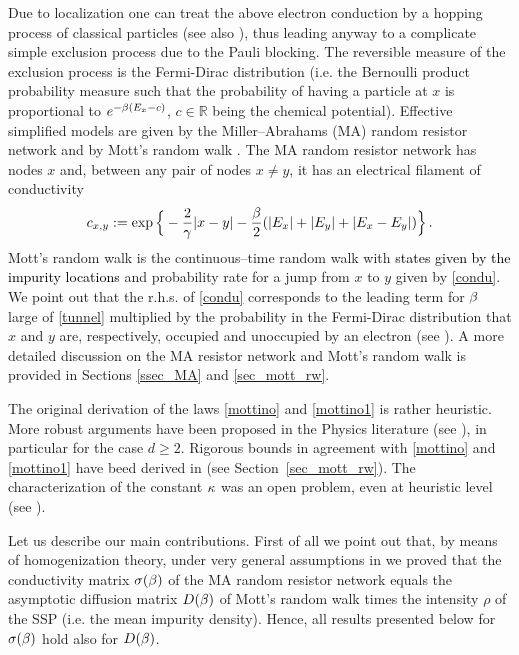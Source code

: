 \documentclass[12pt,a4paper,reqno]{amsart}
\newcommand{\bbR}{{\ensuremath{\mathbb R}} }
\newcommand{\rosso}{\textcolor{black}} %
\newcommand{\be}{\begin{equation}}
\newcommand{\en}{\end{equation}}
\begin{document}
Due to   localization one can treat the above electron conduction by a hopping process of classical particles (see also \cite{ABS,BRSW}), thus leading  anyway to a complicate simple exclusion process due to the  Pauli blocking. The reversible measure of the exclusion process is  the Fermi-Dirac distribution (i.e. the Bernoulli product probability measure  such that the probability of having a particle at $x$ is proportional to $e^{-\beta (E_x-c)}$, $c\in \bbR$ being the chemical potential).
 Effective simplified models   are  given by the Miller--Abrahams (MA) random resistor network \cite{AHL,MA,POF,Sa,SE}   and  by Mott's random walk \cite{FSS}.
The MA random resistor network has nodes $x$ and,   between any  pair of nodes $x\not=y$, it has  an electrical filament of  conductivity 
\be\label{condu}
c_{x,y}:=\exp\Big\{ - \frac{2}{\gamma} |x-y| -\frac{\b}{2} ( |E_x|+ |E_y|+ |E_x-E_y|) \Big\}\,.
\en
Mott's random walk is the continuous--time random walk with \rosso{states given by the impurity locations} and probability rate for a jump from $x$ to $y$ given by \eqref{condu}. We point out that the r.h.s. of \eqref{condu}   corresponds to the leading term for $\beta$ large of \eqref{tunnel} multiplied by the probability in the Fermi-Dirac distribution that $x$ and $y$ are, respectively,   occupied and unoccupied  by an electron 
(see \cite[Eq.~(3.7)]{AHL}). A more detailed discussion on the MA resistor network and Mott's random walk  is provided in Sections \ref{ssec_MA} and \ref{sec_mott_rw}.



The original  derivation of the  laws \eqref{mottino} and \eqref{mottino1} is rather heuristic.  More robust    arguments  have been proposed in the Physics  literature (see \cite{AHL,Po,POF,Sa,SE}), in particular for the case $d\geq 2$.  Rigorous bounds in agreement with \eqref{mottino} and \eqref{mottino1} have beed derived in \cite{CF1,Fhom2,FM,FSS} (see Section~\ref{sec_mott_rw}). The characterization of the constant $\kappa$ was an open problem, even at heuristic level (see \cite[Chapter~5]{POF}). 


\smallskip
Let us describe our main contributions. First  of all we point out that, by means of homogenization theory,  under very general assumptions in \cite{Fhom2}
we proved  that the conductivity matrix $\sigma(\beta)$ of the MA random resistor network equals the asymptotic diffusion matrix $D(\beta)$  of Mott's random walk times the intensity $\rho$ of the SSP  (i.e. the mean impurity density). Hence, all results presented below for $\sigma(\beta)$ hold also for $D(\beta)$.
\end{document}
